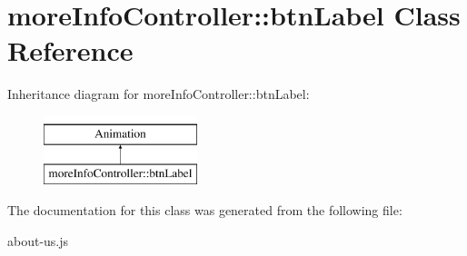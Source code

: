 \hypertarget{classmoreInfoController_1_1btnLabel}{\section{more\-Info\-Controller\-:\-:btn\-Label Class Reference}
\label{classmoreInfoController_1_1btnLabel}
}
Inheritance diagram for more\-Info\-Controller\-:\-:btn\-Label\-:\begin{figure}[H]
\begin{center}
\leavevmode
\includegraphics[height=2.000000cm]{classmoreInfoController_1_1btnLabel}
\end{center}
\end{figure}


The documentation for this class was generated from the following file\-:\begin{DoxyCompactItemize}
\item 
about-\/us.\-js\end{DoxyCompactItemize}
